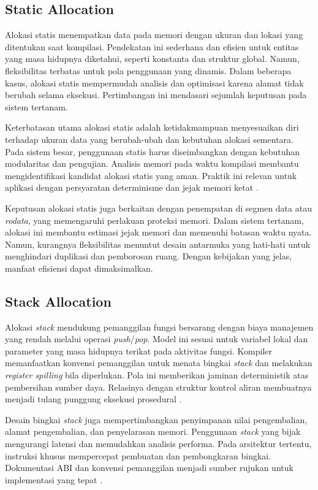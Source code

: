 \documentclass[../main.tex]{subfiles}
\begin{document}
\subsection{Static Allocation}
Alokasi statis menempatkan data pada memori dengan ukuran dan lokasi yang ditentukan saat kompilasi. Pendekatan ini sederhana dan efisien untuk entitas yang masa hidupnya diketahui, seperti konstanta dan struktur global. Namun, fleksibilitas terbatas untuk pola penggunaan yang dinamis. Dalam beberapa kasus, alokasi statis mempermudah analisis dan optimisasi karena alamat tidak berubah selama eksekusi. Pertimbangan ini mendasari sejumlah keputusan pada sistem tertanam.

Keterbatasan utama alokasi statis adalah ketidakmampuan menyesuaikan diri terhadap ukuran data yang berubah-ubah dan kebutuhan alokasi sementara. Pada sistem besar, penggunaan statis harus diseimbangkan dengan kebutuhan modularitas dan pengujian. Analisis memori pada waktu kompilasi membantu mengidentifikasi kandidat alokasi statis yang aman. Praktik ini relevan untuk aplikasi dengan persyaratan determinisme dan jejak memori ketat \citep{WikiMemory}.

Keputusan alokasi statis juga berkaitan dengan penempatan di segmen data atau \emph{rodata}, yang memengaruhi perlakuan proteksi memori. Dalam sistem tertanam, alokasi ini membantu estimasi jejak memori dan memenuhi batasan waktu nyata. Namun, kurangnya fleksibilitas menuntut desain antarmuka yang hati-hati untuk menghindari duplikasi dan pemborosan ruang. Dengan kebijakan yang jelas, manfaat efisiensi dapat dimaksimalkan.

\subsection{Stack Allocation}
Alokasi \emph{stack} mendukung pemanggilan fungsi bersarang dengan biaya manajemen yang rendah melalui operasi \emph{push}/\emph{pop}. Model ini sesuai untuk variabel lokal dan parameter yang masa hidupnya terikat pada aktivitas fungsi. Kompiler memanfaatkan konvensi pemanggilan untuk menata bingkai \emph{stack} dan melakukan \emph{register spilling} bila diperlukan. Pola ini memberikan jaminan deterministik atas pembersihan sumber daya. Relasinya dengan struktur kontrol aliran membuatnya menjadi tulang punggung eksekusi prosedural \citep{WikiCallStack}.

Desain bingkai \emph{stack} juga mempertimbangkan penyimpanan nilai pengembalian, alamat pengembalian, dan penyelarasan memori. Penggunaan \emph{stack} yang bijak mengurangi latensi dan memudahkan analisis performa. Pada arsitektur tertentu, instruksi khusus mempercepat pembuatan dan pembongkaran bingkai. Dokumentasi ABI dan konvensi pemanggilan menjadi sumber rujukan untuk implementasi yang tepat \citep{WikiCallStack}.
\end{document}

